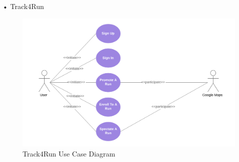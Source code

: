 \begin{enumerate}
\begin{minipage}{\textwidth}
\item[•]{\Large Track4Run}
\FloatBarrier
\begin{figure}[H]
\centering
\includegraphics[scale=0.70]{Images/UseCaseDiagrams/Track4RunCaseDiagram.png}
\caption{Track4Run Use Case Diagram}
\end{figure}
\FloatBarrier
\end{minipage}
\end{enumerate}
\clearpage 

